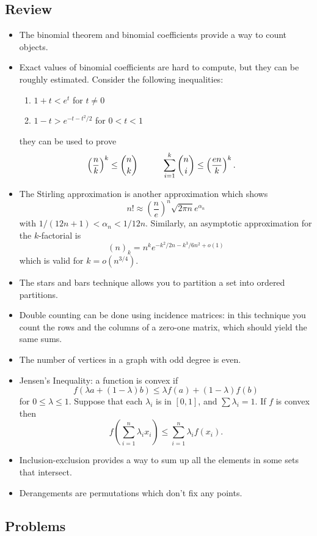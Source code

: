 \subsection{Review}
\begin{itemize}
	\item The binomial theorem and binomial coefficients provide a way to count objects.
	\item Exact values of binomial coefficients are hard to compute, but they can be roughly estimated. Consider the following inequalities:
	\begin{enumerate}
		\item $1+t<e^t$ for $t\neq 0$
		\item $1-t>e^{-t-t^2/2}$ for $0<t<1$
	\end{enumerate}
	they can be used to prove 
	\begin{align*}
		\left(\frac{n}{k}\right)^k\leq\binom{n}{k}&\hspace{10mm} \sum_{i=1}^k\binom{n}{i}\leq \left(\frac{en}{k}\right)^k.
	\end{align*}
	\item The Stirling approximation is another approximation which shows
	$$n!\approx\left(\frac{n}{e}\right)^n\sqrt{2\pi n}e^{\alpha_n}$$
	with $1/(12n+1)<\alpha_n<1/12n$. Similarly, an asymptotic approximation for the $k$-factorial is
	$$(n)_k=n^ke^{-k^2/2n-k^3/6n^2+o(1)}$$ which is valid for $k=o(n^{3/4}).$
	\item The stars and bars technique allows you to partition a set into ordered partitions.
	\item Double counting can be done using incidence matrices: in this technique you count the rows and the columns of a zero-one matrix, which should yield the same sums.
	\item The number of vertices in a graph with odd degree is even.
	\item Jensen's Inequality: a function is convex if 
	$$f(\lambda a+(1-\lambda)b)\leq \lambda f(a)+(1-\lambda)f(b)$$
	for $0\leq\lambda\leq 1$. Suppose that each $\lambda_i$ is in $[0,1]$, and $\sum\lambda_i=1$. If $f$ is convex then
	$$f\left(\sum_{i=1}^n\lambda_ix_i\right)\leq\sum_{i=1}^n\lambda_if(x_i).$$
	\item Inclusion-exclusion provides a way to sum up all the elements in some sets that intersect.
	\item Derangements are permutations which don't fix any points.
\end{itemize}

\subsection{Problems}

